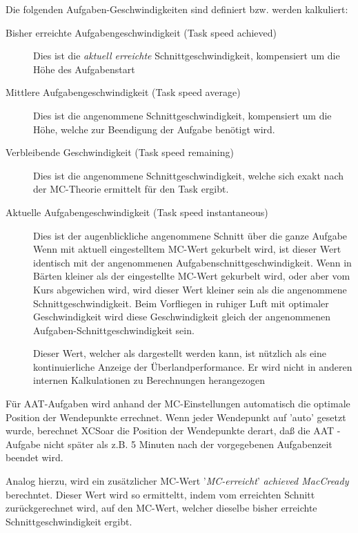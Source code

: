 Die folgenden Aufgaben-Geschwindigkeiten sind definiert bzw. werden kalkuliert:
\begin{description}
\item[Bisher erreichte Aufgabengeschwindigkeit (Task speed achieved)]  Dies ist die \emph{aktuell
erreichte} Schnittgeschwindigkeit, kompensiert um die Höhe des Aufgabenstart 
\item[Mittlere Aufgabengeschwindigkeit (Task speed average)] Dies ist die angenommene
Schnittgeschwindigkeit, kompensiert um die Höhe, welche zur Beendigung der Aufgabe benötigt wird.
\item[Verbleibende Geschwindigkeit (Task speed remaining)]  Dies ist die angenommene Schnittgeschwindigkeit,
welche sich exakt nach der MC-Theorie ermittelt für den Task ergibt.
\item[Aktuelle Aufgabengeschwindigkeit (Task speed instantaneous)]  Dies ist der augenblickliche
angenommene Schnitt über die ganze Aufgabe
Wenn mit aktuell eingestelltem MC-Wert gekurbelt wird, ist dieser Wert
identisch mit der angenommenen Aufgabenschnittgeschwindigkeit.
Wenn in Bärten kleiner als der eingestellte MC-Wert gekurbelt wird, oder aber vom Kurs
abgewichen wird,  wird dieser Wert kleiner sein als die angenommene Schnittgeschwindigkeit.
Beim Vorfliegen in ruhiger Luft mit optimaler Geschwindigkeit wird diese Geschwindigkeit
gleich der angenommenen Aufgaben-Schnittgeschwindigkeit sein.

Dieser Wert, welcher als {\InfoBox} dargestellt werden kann, ist nützlich als eine kontinuierliche Anzeige
der Überlandperformance. Er wird nicht in anderen internen Kalkulationen zu Berechnungen herangezogen
\end{description}

Für AAT-Aufgaben wird anhand der MC-Einstellungen automatisch die optimale Position
der Wendepunkte errechnet.  \tip Wenn jeder Wendepunkt auf  'auto'  gesetzt wurde,  berechnet
\textsf{XCSoar} die Position der Wendepunkte derart, daß die AAT - Aufgabe nicht später als z.B. 5
Minuten nach der vorgegebenen Aufgabenzeit beendet wird.

Analog hierzu, wird ein zusätzlicher MC-Wert '\emph{MC-erreicht}' {\em achieved MacCready} berechntet.
Dieser Wert wird so ermitteltt, indem vom erreichten Schnitt zurückgerechnet wird,
auf den MC-Wert, welcher dieselbe bisher erreichte Schnittgeschwindigkeit ergibt.

